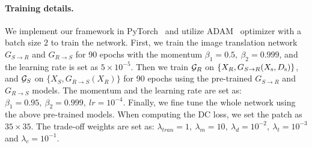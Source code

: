 \documentclass[10pt,twocolumn,letterpaper]{article}
\begin{document}
\paragraph{Training details.}
We implement our framework in PyTorch~\cite{nishino2012bayesian} and utilize ADAM~\cite{kingma2014adam} optimizer with a batch size $2$ to train the network.
First, we train the image translation network ${G_{S \to R}}$ and ${G_{R \to S}}$ for 90 epochs with the momentum ${\beta _1} = 0.5 ,\ {\beta _2} = 0.999$, and the learning rate is set as $5 \times {10^{ - 5}}$.
Then we train ${{\cal G}_R}$ on $\{ {X_R},{G_{S \to R}}({X_{\rm{s}}},{D_{\rm{s}}})\} $, and ${{\cal G}_S}$ on $\{ {X_S},{G_{R \to S}}({X_R})\} $ for 90 epochs using the pre-trained  ${G_{S \to R}}$ and ${G_{R \to S}}$ models.
The momentum and the learning rate are set as:
${\beta _1} = 0.95,\ {\beta _2} = 0.999,\ lr = {10^{ - 4}}$. 
Finally, we fine tune the whole network using the above pre-trained models.
When computing the DC loss, we set the patch as $35\times35$.
The trade-off weights are set as: $\lambda_{tran} = 1,\ \lambda_m  = 10,\ \lambda_d  = {10^{ - 2}},\ \lambda_t  = {10^{ - 3}}$ and $\lambda_c  = {10^{ - 1}}$.
\end{document}
